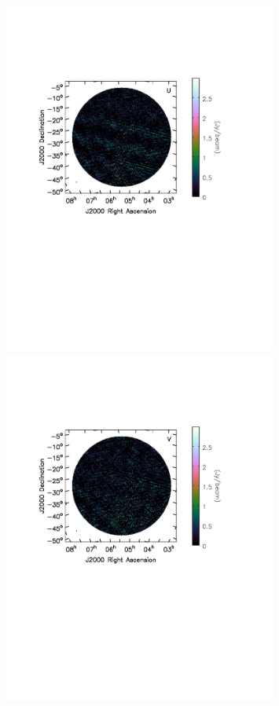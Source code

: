 \begin{figure}
\includegraphics[clip, trim=0.5cm 11cm 4cm 5cm, width=0.8\textwidth]{chapters/polcal/figures/6830-U-better-dcal.pdf}
\includegraphics[clip, trim=0.5cm 11cm 4cm 5cm, width=0.8\textwidth]{chapters/polcal/figures/6830-V-better-dcal.pdf}

\end{figure}
